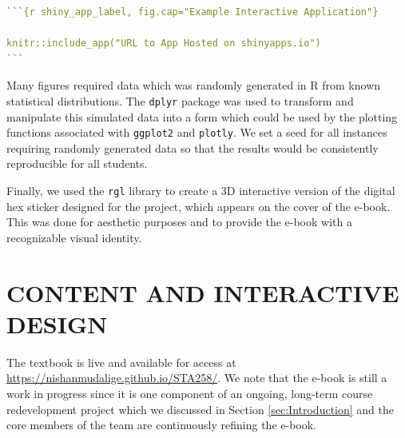 \documentclass[11pt]{article}
\begin{document}
\begin{lstlisting}[language=R,
                   caption={An example of a code block in Markdown used to embed a Shiny app.},
                   label={lst:Markdown_shiny},
                   captionpos=b] 
```{r shiny_app_label, fig.cap="Example Interactive Application"}

knitr::include_app("URL to App Hosted on shinyapps.io")
```
\end{lstlisting}

Many figures required data which was randomly generated in R from known statistical distributions.
The \texttt{dplyr} package was used to transform and manipulate this simulated data into a form which could be used by the plotting functions associated with \texttt{ggplot2} and \texttt{plotly}.
We set a seed for all instances requiring randomly generated data so that the results would be consistently reproducible for all students. 

Finally, we used the \texttt{rgl} library to create a 3D interactive version of the digital hex sticker designed for the project, which appears on the cover of the e-book.
This was done for aesthetic purposes and to provide the e-book with a recognizable visual identity.


\section{CONTENT AND INTERACTIVE DESIGN}

The textbook is live and available for access at \href{https://nishanmudalige.github.io/STA258/}{https://nishanmudalige.github.io/STA258/}.
We note that the e-book is still a work in progress since it is one component of an ongoing, long-term course redevelopment project which we discussed in Section \ref{sec:Introduction} and the core members of the team are continuously refining the e-book.
\end{document}
